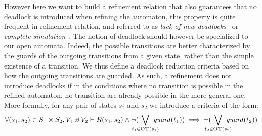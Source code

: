 \documentclass[runningheads]{llncs}
\begin{document}
%
%





However here we want to build a refinement relation that  also guarantees that no deadlock is introduced when refining the automaton, this property is quite frequent in refinement relation, and referred to as \emph{lack of new deadlocks}~\cite{Kouchnarenko:2007} or \emph{complete simulation}~\cite{sangiorgi:bisim-coind12}.
The notion of deadlock should however be specialized to our open automata. Indeed, the possible transitions are better characterized by the guards of the outgoing transitions from a given state, rather than the simple existence of a transition. We thus define a deadlock reduction criteria based on how the outgoing transitions are guarded.
As such, a refinement does not introduce deadlocks if in the conditions where no transition is possible in the refined automaton, no transition are already possible in the more general one. More formally, for any pair of states $s_1$ and $s_2$  we introduce a criteria of the form: 
\[
\forall \mpar{s_1, s_2} \in S_1 \times S_2, V_1 \uplus V_2  \vdash R\mpar{s_1, s_2} \wedge \lnot( \bigvee_\subbox{t_1 \in \fOT{s_1}} \fguard{t_1} )\implies \lnot( \bigvee_\subbox{t_2 \in \fOT{s_2}} \fguard{t_2}  )
\]
\end{document}
